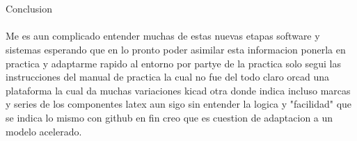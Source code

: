 \documentclass[10pt,a4paper]{article}
\begin{document}
\\
\\
Conclusion \\
\\
Me es aun complicado entender muchas de estas nuevas etapas software y sistemas esperando que en lo pronto poder asimilar esta informacion ponerla en practica y adaptarme rapido al entorno por partye de la practica solo segui las instrucciones del manual de practica la cual no fue del todo claro orcad una plataforma la cual da muchas variaciones kicad otra donde indica incluso marcas y series de los componentes latex aun sigo sin entender la logica y "facilidad" que se indica lo mismo con github en fin creo que es cuestion de adaptacion a un modelo acelerado.
\end{document}

